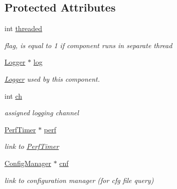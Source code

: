 \subsection*{Protected Attributes}
\begin{DoxyCompactItemize}
\item 
\mbox{\label{classQualityManagerComponent_add2cffa903c310563f8b999cdecd1953}} 
int \hyperlink{classQualityManagerComponent_add2cffa903c310563f8b999cdecd1953}{threaded}
\begin{DoxyCompactList}\small\item\em flag, is equal to 1 if component runs in separate thread \end{DoxyCompactList}\item 
\mbox{\label{classQualityManagerComponent_a4814e26628086f8bb5602c1b27b6e874}} 
\hyperlink{classLogger}{Logger} $\ast$ \hyperlink{classQualityManagerComponent_a4814e26628086f8bb5602c1b27b6e874}{log}
\begin{DoxyCompactList}\small\item\em \hyperlink{classLogger}{Logger} used by this component. \end{DoxyCompactList}\item 
\mbox{\label{classQualityManagerComponent_a11e3af69208fe05b075f7624f5adfe16}} 
int \hyperlink{classQualityManagerComponent_a11e3af69208fe05b075f7624f5adfe16}{ch}
\begin{DoxyCompactList}\small\item\em assigned logging channel \end{DoxyCompactList}\item 
\mbox{\label{classQualityManagerComponent_a4fd1a4195c14f0a4dc277e64b494e9f6}} 
\hyperlink{classPerfTimer}{Perf\+Timer} $\ast$ \hyperlink{classQualityManagerComponent_a4fd1a4195c14f0a4dc277e64b494e9f6}{perf}
\begin{DoxyCompactList}\small\item\em link to \hyperlink{classPerfTimer}{Perf\+Timer} \end{DoxyCompactList}\item 
\mbox{\label{classQualityManagerComponent_a021f9991b72d52f295b87d8a5b02046a}} 
\hyperlink{classConfigManager}{Config\+Manager} $\ast$ \hyperlink{classQualityManagerComponent_a021f9991b72d52f295b87d8a5b02046a}{cnf}
\begin{DoxyCompactList}\small\item\em link to configuration manager (for cfg file query) \end{DoxyCompactList}\end{DoxyCompactItemize}


